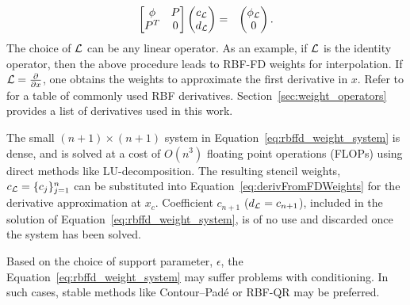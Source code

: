 \documentclass[11pt]{report}
\begin{document}
{\begin{eqnarray}
\begin{bmatrix} \phi & P \\
		P^T & 0 \end{bmatrix} \begin{pmatrix} c_{\mathcal{L}} \\ 
							d_{\mathcal{L}} \end{pmatrix} & = & \begin{pmatrix} \phi_{\mathcal{L}} \\
							0 \end{pmatrix}. \nonumber
	\end{eqnarray}	
The choice of $\mathcal{L}$ can be any linear operator. As an example, if $\diffop$ is the identity operator, then the above procedure leads to RBF-FD weights for interpolation. If $\mathcal{L}=\frac{\partial }{\partial x}$, one obtains the weights to approximate the first derivative in $x$. Refer to \cite{Fasshauer2007} for a table of commonly used RBF derivatives. Section~\ref{sec:weight_operators} provides a list of derivatives used in this work. 

The small $(n + 1) \times (n + 1)$ system in Equation~\ref{eq:rbffd_weight_system} is dense, and is solved at a cost of $O(n^3)$ floating point operations (FLOPs) using direct methods like LU-decomposition. The resulting stencil weights, $c_{\mathcal{L}} = \{c_j\}_{j=1}^n$ can be substituted into Equation~\ref{eq:derivFromFDWeights} for the derivative approximation at $x_c$. Coefficient $c_{n+1}$ ($d_{\mathcal{L}} = c_{n+1}$), included in the solution of Equation~\ref{eq:rbffd_weight_system}, is of no use and discarded once the system has been solved. 

Based on the choice of support parameter, $\epsilon$, the Equation~\ref{eq:rbffd_weight_system} may suffer problems with conditioning. In such cases, stable methods like Contour--Pad\'{e} \cite{Wright2003} or RBF-QR \cite{Fornberg2011a,Davydov2011} may be preferred.  




}
\end{document}
